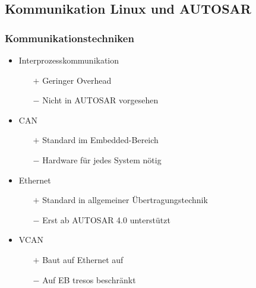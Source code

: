 \documentclass[]{beamer}
\begin{document}
\subsection{Kommunikation Linux und AUTOSAR}
\begin{frame}
\frametitle{Kommunikationstechniken}

    \begin{itemize}
        \pause
        \item Interprozesskommunikation
        \begin{itemize}
            \item[$ + $] Geringer Overhead
            \item[$ - $] Nicht in AUTOSAR vorgesehen
        \end{itemize}
        \pause
        \item CAN
        \begin{itemize}
            \item[$ + $] Standard im Embedded-Bereich
            \item[$ - $] Hardware für jedes System nötig
        \end{itemize}
        \pause
        \item Ethernet
        \begin{itemize}
            \item[$ + $] Standard in allgemeiner Übertragungstechnik
            \item[$ - $] Erst ab AUTOSAR 4.0 unterstützt
        \end{itemize}
        \pause
        \item VCAN
        \begin{itemize}
            \item[$ + $] Baut auf Ethernet auf
            \item[$ - $] Auf EB tresos beschränkt
        \end{itemize}
    \end{itemize}

\end{frame}
\end{document}
